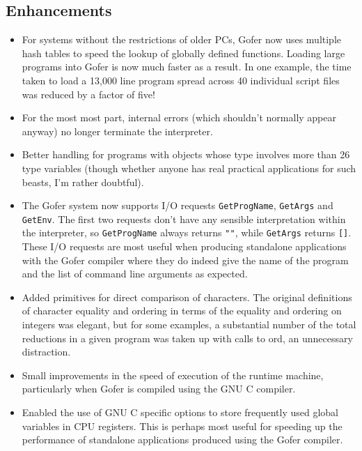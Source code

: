 \subsection{Enhancements}
\begin{itemize}
\item  For systems without the restrictions of older PCs, Gofer now uses
     multiple hash tables to speed the lookup of globally defined
     functions.  Loading large programs into Gofer is now much faster
     as a result.  In one example, the time taken to load a 13,000 line
     program spread across 40 individual script files was reduced by a
     factor of five!

\item  For the most most part, internal errors (which shouldn't normally
     appear anyway) no longer terminate the interpreter.

\item  Better handling for programs with objects whose type involves more
     than 26 type variables (though whether anyone has real practical
     applications for such beasts, I'm rather doubtful).

\item  The Gofer system now supports I/O requests \verb"GetProgName", \verb"GetArgs"
     and \verb"GetEnv".  The first two requests don't have any sensible
     interpretation within the interpreter, so \verb"GetProgName" always
     returns \verb/""/, while \verb"GetArgs" returns \verb"[]".  These I/O requests are most
     useful when producing standalone applications with the Gofer
     compiler where they do indeed give the name of the program and the
     list of command line arguments as expected.

\item  Added primitives for direct comparison of characters.  The
     original definitions of character equality and ordering in terms
     of the equality and ordering on integers was elegant, but for some
     examples, a substantial number of the total reductions in a given
     program was taken up with calls to ord, an unnecessary
     distraction.

\item  Small improvements in the speed of execution of the runtime machine,
     particularly when Gofer is compiled using the GNU C compiler.
 
\item  Enabled the use of GNU C specific options to store frequently used
     global variables in CPU registers.  This is perhaps most useful
     for speeding up the performance of standalone applications
     produced using the Gofer compiler.


\end{itemize}
